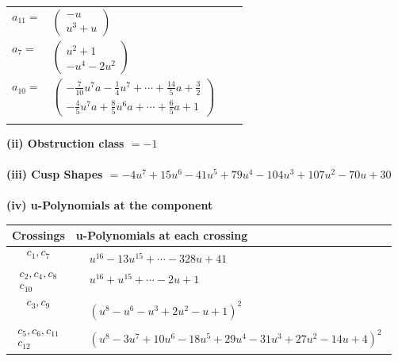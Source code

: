 \documentclass[1p]{elsarticle_modified}
\theoremstyle{definition}
\begin{document}
\begin{tabular}{m{7pt} m{180pt} m{7pt} m{180pt} }
\flushright $a_{11}=$&$\begin{pmatrix}- u\\u^3+u\end{pmatrix}$ \\
\flushright $a_{7}=$&$\begin{pmatrix}u^2+1\\- u^4-2 u^2\end{pmatrix}$ \\
\flushright $a_{10}=$&$\begin{pmatrix}-\frac{7}{10} u^7 a-\frac{1}{4} u^7+\cdots+\frac{14}{5} a+\frac{3}{2}\\-\frac{4}{5} u^7 a+\frac{8}{5} u^6 a+\cdots+\frac{6}{5} a+1\end{pmatrix}$\\&\end{tabular}
\flushleft \textbf{(ii) Obstruction class $= -1$}\\~\\
\flushleft \textbf{(iii) Cusp Shapes $= -4 u^7+15 u^6-41 u^5+79 u^4-104 u^3+107 u^2-70 u+30$}\\~\\
\newpage\renewcommand{\arraystretch}{1}
\flushleft \textbf{(iv) u-Polynomials at the component}\newline \\
\begin{tabular}{m{50pt}|m{274pt}}
Crossings & \hspace{64pt}u-Polynomials at each crossing \\
\hline $$\begin{aligned}c_{1},c_{7}\end{aligned}$$&$\begin{aligned}
&u^{16}-13 u^{15}+\cdots-328 u+41
\end{aligned}$\\
\hline $$\begin{aligned}c_{2},c_{4},c_{8}\\c_{10}\end{aligned}$$&$\begin{aligned}
&u^{16}+u^{15}+\cdots-2 u+1
\end{aligned}$\\
\hline $$\begin{aligned}c_{3},c_{9}\end{aligned}$$&$\begin{aligned}
&(u^8- u^6- u^3+2 u^2- u+1)^2
\end{aligned}$\\
\hline $$\begin{aligned}c_{5},c_{6},c_{11}\\c_{12}\end{aligned}$$&$\begin{aligned}
&(u^8-3 u^7+10 u^6-18 u^5+29 u^4-31 u^3+27 u^2-14 u+4)^2
\end{aligned}$\\
\hline
\end{tabular}\\~\\
\end{document}

